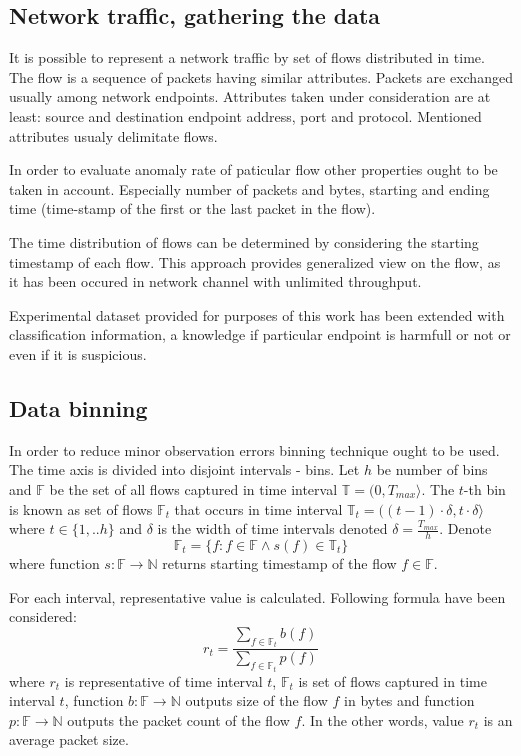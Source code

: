 \documentclass[a4paper,journal]{IEEEtran}
\begin{document}
\subsection{Network traffic, gathering the data}
It is possible to represent a network traffic by set of flows distributed in time. The flow is a sequence of packets having  similar attributes. Packets are exchanged usually among network endpoints. Attributes taken under consideration are at least: source and destination endpoint address, port and protocol. Mentioned attributes usualy delimitate flows.

In order to evaluate anomaly rate of paticular flow other properties ought to be taken in account. Especially number of packets and bytes, starting and ending time (time-stamp of the first or the last packet in the flow).

The time distribution of flows can be determined by considering the starting timestamp of each flow. This approach provides generalized view on the flow, as it has been occured in network channel with unlimited throughput.

Experimental dataset provided for purposes of this work has been extended with classification information, a knowledge if particular endpoint is harmfull or not or even if it is suspicious.

\subsection{Data binning}
In order to reduce minor observation errors binning technique ought to be used. The time axis is divided into disjoint intervals - bins. Let $h$ be number of bins and $\mathbb{F}$ be the set of all flows captured in time interval $\mathbb{T} = (0, T_{max}\rangle $. The $t$-th bin is known as  set of flows $\mathbb{F}_t$ that occurs in time interval $\mathbb{T}_t = ((t-1)\cdot \delta, t\cdot \delta\rangle $ where $t \in \{1, .. h\}$ and $\delta$ is the width of time intervals denoted $\delta = \frac{T_{max}}{h}$. Denote
\begin{equation}
\mathbb{F}_t = \{f : f \in \mathbb{F} \wedge s(f) \in \mathbb{T}_t \}
\end{equation}
where function $s:\mathbb{F} \rightarrow \mathbb{N} $ 
returns starting timestamp of the flow $f\in \mathbb{F}$.

For each interval,
representative value is calculated. Following formula have been considered:
\begin{equation}\label{eq:represent}
r_t = \frac{\sum\limits_{f\in \mathbb{F}_t}b(f)}{\sum\limits_{f\in \mathbb{F}_t}p(f)}
\end{equation}
where $r_t$ is representative of time interval $t$, $\mathbb{F}_t$ is set of flows captured in time 
interval $t$, function $b:\mathbb{F} \rightarrow \mathbb{N}$ outputs size of the flow $f$ in bytes and function 
$p:\mathbb{F} \rightarrow \mathbb{N}$ outputs the packet count of the flow $f$. 
In the other words, value $r_t$ is an average packet size. 
\end{document}
